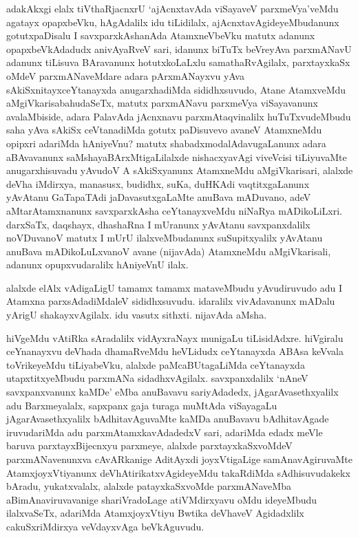 \begin{artha}%
adakAkxgi elalx tiVthaRjacnxrU `ajAcnxtavAda viSayaveV parxmeVya'veMdu agatayx opapxbeVku, hAgAdalilx idu tiLidilalx, ajAcnxtavAgideyeMbudanunx gotutxpaDisalu I savxparxkAshanAda AtamxneVbeVku matutx adanunx opapxbeVkAdadudx anivAyaRveV sari, idanunx biTuTx beVreyAva parxmANavU adanunx tiLisuva BAravanunx hotutxkoLaLxlu samathaRvAgilalx, parxtayxkaSx oMdeV parxmANaveMdare adara pArxmANayxvu yAva sAkiSxnitayxceYtanayxda anugarxhadiMda sididhxsuvudo, Atane AtamxveMdu aMgiVkarisabahudaSeTx, matutx parxmANavu parxmeVya viSayavanunx avalaMbiside, adara PalavAda jAcnxnavu parxmAtaqvinalilx huTuTxvudeMbudu saha yAva sAkiSx ceVtanadiMda gotutx paDisuvevo avaneV AtamxneMdu opipxri adariMda hAniyeVnu? matutx shabadxmodalAdavugaLanunx adara aBAvavanunx saMshayaBArxMtigaLilalxde nishacxyavAgi viveVcisi tiLiyuvaMte anugarxhisuvadu yAvudoV A sAkiSxyanunx AtamxneMdu aMgiVkarisari, alalxde deVha iMdirxya, manasusx, budidhx, suKa, duHKAdi vaqtitxgaLanunx yAvAtanu GaTapaTAdi jaDavasutxgaLaMte anuBava mADuvano, adeV aMtarAtamxnanunx savxparxkAsha ceYtanayxveMdu niNaRya mADikoLiLxri. darxSaTx, daqshayx, dhashaRna I mUranunx yAvAtanu savxpanxdalilx noVDuvanoV matutx I mUrU ilalxveMbudanunx suSupitxyalilx yAvAtanu anuBava mADikoLuLxvanoV avane (nijavAda) AtamxneMdu aMgiVkarisali, adanunx opupxvudaralilx hAniyeVnU ilalx.
\end{artha}

\begin{artha}
alalxde elAlx vAdigaLigU tamamx tamamx mataveMbudu yAvudiruvudo adu I Atamxna parxsAdadiMdaleV sididhxsuvudu. idaralilx vivAdavanunx mADalu yArigU shakayxvAgilalx. idu vasutx sithxti. nijavAda aMsha. 
\end{artha}

\begin{artha}
hiVgeMdu vAtiRka sAradalilx vidAyxraNayx munigaLu tiLisidAdxre. hiVgiralu ceYnanayxvu deVhada dhamaRveMdu heVLidudx ceYtanayxda ABAsa keVvala toVrikeyeMdu tiLiyabeVku, alalxde paMcaBUtagaLiMda ceYtanayxda utapxtitxyeMbudu parxmANa sidadhxvAgilalx. savxpanxdalilx `nAneV savxpanxvanunx kaMDe' eMba anuBavavu sariyAdadedx, jAgarAvasethxyalilx adu Barxmeyalalx, sapxpanx gaja turaga muMtAda viSayagaLu jAgarAvasethxyalilx bAdhitavAguvaMte kaMDa anuBavavu bAdhitavAgade iruvudariMda adu parxmAtamxkavAdadedxV sari, adariMda edadx meVle baruva parxtayxBijecnxyu parxmeye, alalxde parxtayxkaSxvoMdeV parxmANavenunxva cAvARkanige AditAyxdi joyxVtigaLige samAnavAgiruvaMte AtamxjoyxVtiyanunx deVhAtirikatxvAgideyeMdu takaRdiMda sAdhisuvudakekx bAradu, yukatxvalalx, alalxde patayxkaSxvoMde parxmANaveMba aBimAnaviruvavanige shariVradoLage atiVMdirxyavu oMdu ideyeMbudu ilalxvaSeTx, adariMda AtamxjoyxVtiyu Bwtika deVhaveV Agidadxlilx cakuSxriMdirxya veVdayxvAga beVkAguvudu.
\end{artha}%

